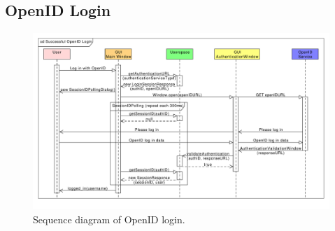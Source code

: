 \subsection{OpenID Login}

\begin{figure}[h]
\begin{center}
\includegraphics[scale=0.55, angle=90]{figures/openid_login_sequence.pdf}
\end{center}
\caption{Sequence diagram of OpenID login.}\label{gui:sd:openid_login}
\end{figure}

